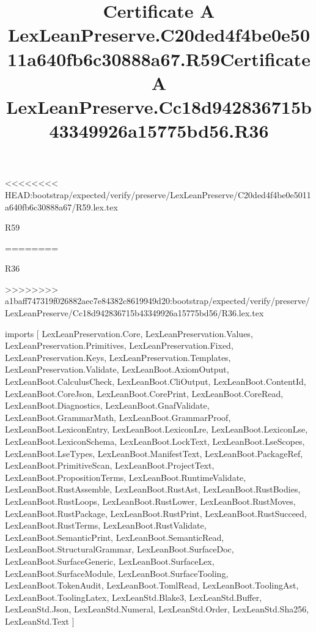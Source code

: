 <<<<<<<< HEAD:bootstrap/expected/verify/preserve/LexLeanPreserve/C20ded4f4be0e5011a640fb6c30888a67/R59.lex.tex
\begin{lexlean}{R59}
\title{Certificate A LexLeanPreserve.C20ded4f4be0e5011a640fb6c30888a67.R59}
========
\begin{lexlean}{R36}
\title{Certificate A LexLeanPreserve.Cc18d942836715b43349926a15775bd56.R36}
>>>>>>>> a1baff747319f026882aec7e84382c8619949d20:bootstrap/expected/verify/preserve/LexLeanPreserve/Cc18d942836715b43349926a15775bd56/R36.lex.tex
\begin{coremodule}
imports [
  LexLeanPreservation.Core,
  LexLeanPreservation.Values,
  LexLeanPreservation.Primitives,
  LexLeanPreservation.Fixed,
  LexLeanPreservation.Keys,
  LexLeanPreservation.Templates,
  LexLeanPreservation.Validate,
  LexLeanBoot.AxiomOutput,
  LexLeanBoot.CalculusCheck,
  LexLeanBoot.CliOutput,
  LexLeanBoot.ContentId,
  LexLeanBoot.CoreJson,
  LexLeanBoot.CorePrint,
  LexLeanBoot.CoreRead,
  LexLeanBoot.Diagnostics,
  LexLeanBoot.GnafValidate,
  LexLeanBoot.GrammarMath,
  LexLeanBoot.GrammarProof,
  LexLeanBoot.LexiconEntry,
  LexLeanBoot.LexiconLre,
  LexLeanBoot.LexiconLse,
  LexLeanBoot.LexiconSchema,
  LexLeanBoot.LockText,
  LexLeanBoot.LseScopes,
  LexLeanBoot.LseTypes,
  LexLeanBoot.ManifestText,
  LexLeanBoot.PackageRef,
  LexLeanBoot.PrimitiveScan,
  LexLeanBoot.ProjectText,
  LexLeanBoot.PropositionTerms,
  LexLeanBoot.RuntimeValidate,
  LexLeanBoot.RustAssemble,
  LexLeanBoot.RustAst,
  LexLeanBoot.RustBodies,
  LexLeanBoot.RustLoops,
  LexLeanBoot.RustLower,
  LexLeanBoot.RustMoves,
  LexLeanBoot.RustPackage,
  LexLeanBoot.RustPrint,
  LexLeanBoot.RustSucceed,
  LexLeanBoot.RustTerms,
  LexLeanBoot.RustValidate,
  LexLeanBoot.SemanticPrint,
  LexLeanBoot.SemanticRead,
  LexLeanBoot.StructuralGrammar,
  LexLeanBoot.SurfaceDoc,
  LexLeanBoot.SurfaceGeneric,
  LexLeanBoot.SurfaceLex,
  LexLeanBoot.SurfaceModule,
  LexLeanBoot.SurfaceTooling,
  LexLeanBoot.TokenAudit,
  LexLeanBoot.TomlRead,
  LexLeanBoot.ToolingAst,
  LexLeanBoot.ToolingLatex,
  LexLeanStd.Blake3,
  LexLeanStd.Buffer,
  LexLeanStd.Json,
  LexLeanStd.Numeral,
  LexLeanStd.Order,
  LexLeanStd.Sha256,
  LexLeanStd.Text
]


\end{coremodule}
\end{lexlean}
\end{lexlean}
